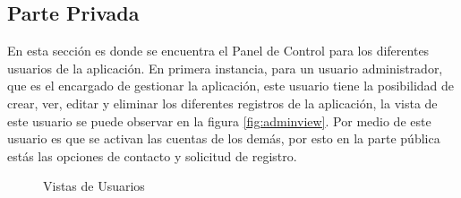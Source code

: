 \subsection{Parte Privada}

En esta sección es donde se encuentra el Panel de Control para los diferentes usuarios de la aplicación. En primera instancia, para un usuario administrador, que es el encargado de gestionar la aplicación, este usuario tiene la posibilidad de crear, ver, editar y eliminar los diferentes registros de la aplicación, la vista de este usuario se puede observar en la figura \ref{fig:adminview}. Por medio de este usuario es que se activan las cuentas de los demás, por esto en la parte pública estás las opciones de contacto y solicitud de registro.\\

\begin{figure}[H]
	\centering
	\caption{Vistas de Usuarios}
	\label{fig:views}
\end{figure}


